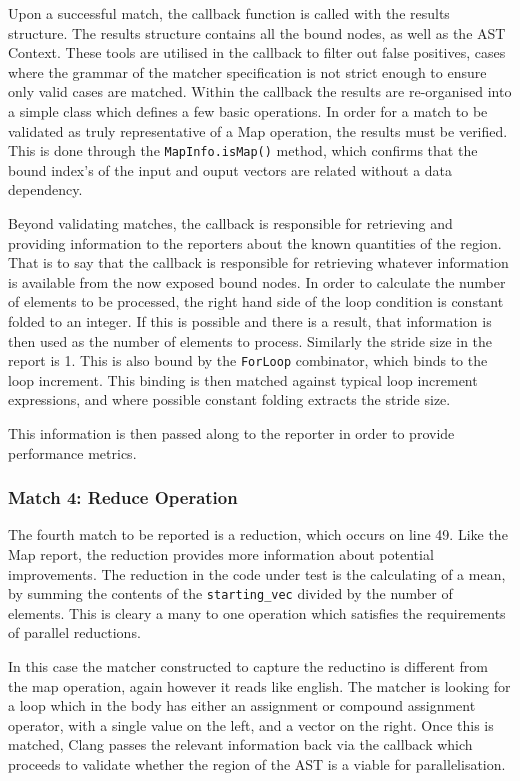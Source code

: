 Upon a successful match, the callback function is called with the results structure. The results
structure contains all the bound nodes, as well as the AST Context. These tools are utilised in the
callback to filter out false positives, cases where the grammar of the matcher specification is not
strict enough to ensure only valid cases are matched. Within the callback the results are
re-organised into a simple class which defines a few basic operations. In order for a match to be
validated as truly representative of a Map operation, the results must be verified. This is done
through the \lstinline{MapInfo.isMap()} method, which confirms that the bound index's of the input
and ouput vectors are related without a data dependency.

Beyond validating matches, the callback is responsible for retrieving and providing information to
the reporters about the known quantities of the region. That is to say that the callback is
responsible for retrieving whatever information is available from the now exposed bound nodes.  In
order to calculate the number of elements to be processed, the right hand side of the loop condition
is constant folded to an integer. If this is possible and there is a result, that information is
then used as the number of elements to process. Similarly the stride size in the report is 1. This
is also bound by the \lstinline{ForLoop} combinator, which binds to the loop increment. This binding
is then matched against typical loop increment expressions, and where possible constant folding
extracts the stride size.

This information is then passed along to the reporter in order to provide performance metrics.

\subsubsection{Match 4: Reduce Operation}
The fourth match to be reported is a reduction, which occurs on line 49. Like the Map report, the
reduction provides more information about potential improvements. The reduction in the code under
test is the calculating of a mean, by summing the contents of the \lstinline{starting_vec} divided
by the number of elements. This is cleary a many to one operation which satisfies the requirements
of parallel reductions. 

In this case the matcher constructed to capture the reductino is different from the map operation,
again however it reads like english. The matcher is looking for a loop which in the body has either
an assignment or compound assignment operator, with a single value on the left, and a vector on the
right. Once this is matched, Clang passes the relevant information back via the callback which
proceeds to validate whether the region of the AST is a viable for parallelisation.

